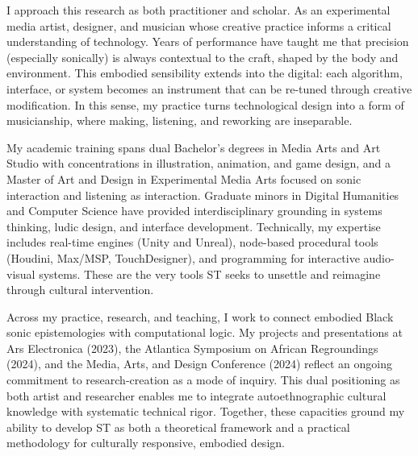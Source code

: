 I approach this research as both practitioner and scholar. As an experimental media artist, designer, and musician whose creative practice informs a critical understanding of technology. Years of performance have taught me that precision (especially sonically) is always contextual to the craft, shaped by the body and environment. This embodied sensibility extends into the digital: each algorithm, interface, or system becomes an instrument that can be re-tuned through creative modification. In this sense, my practice turns technological design into a form of musicianship, where making, listening, and reworking are inseparable.

My academic training spans dual Bachelor’s degrees in Media Arts and Art Studio with concentrations in illustration, animation, and game design, and a Master of Art and Design in Experimental Media Arts focused on sonic interaction and listening as interaction. Graduate minors in Digital Humanities and Computer Science have provided interdisciplinary grounding in systems thinking, ludic design, and interface development. Technically, my expertise includes real-time engines (Unity and Unreal), node-based procedural tools (Houdini, Max/MSP, TouchDesigner), and programming for interactive audio-visual systems. These are the very tools ST seeks to unsettle and reimagine through cultural intervention.

Across my practice, research, and teaching, I work to connect embodied Black sonic epistemologies with computational logic. My projects and presentations at Ars Electronica (2023), the Atlantica Symposium on African Regroundings (2024), and the Media, Arts, and Design Conference (2024) reflect an ongoing commitment to research-creation as a mode of inquiry. This dual positioning as both artist and researcher enables me to integrate autoethnographic cultural knowledge with systematic technical rigor. Together, these capacities ground my ability to develop ST as both a theoretical framework and a practical methodology for culturally responsive, embodied design.